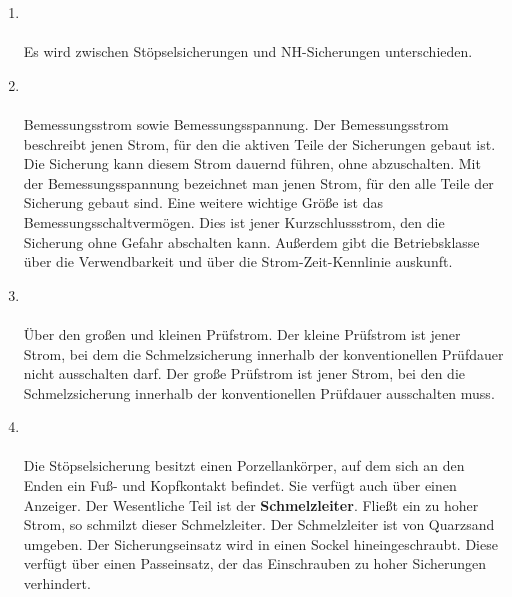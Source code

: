 \begin{enumerate}
    \item   {} \\\\
            Es wird zwischen Stöpselsicherungen und NH-Sicherungen unterschieden.

    \item   {} \\\\
            Bemessungsstrom sowie Bemessungsspannung. Der Bemessungsstrom beschreibt jenen Strom, für den die aktiven Teile der Sicherungen gebaut ist. Die Sicherung 
            kann diesem Strom dauernd führen, ohne abzuschalten. Mit der Bemessungsspannung bezeichnet man jenen Strom, für den alle Teile der Sicherung gebaut sind.
            Eine weitere wichtige Größe ist das Bemessungsschaltvermögen. Dies ist jener Kurzschlussstrom, den die Sicherung ohne Gefahr abschalten kann.
            Außerdem gibt die Betriebsklasse über die Verwendbarkeit und über die Strom-Zeit-Kennlinie auskunft.

    \item   {} \\\\
            Über den großen und kleinen Prüfstrom. Der kleine Prüfstrom ist jener Strom, bei dem die Schmelzsicherung innerhalb der konventionellen Prüfdauer nicht ausschalten darf. Der große Prüfstrom ist jener Strom, 
            bei den die Schmelzsicherung innerhalb der konventionellen Prüfdauer ausschalten muss.

    \item   {} \\\\
            Die Stöpselsicherung besitzt einen Porzellankörper, auf dem sich an den Enden ein Fuß- und Kopfkontakt befindet.
            Sie verfügt auch über einen Anzeiger. Der Wesentliche Teil ist der \textbf{Schmelzleiter}. Fließt ein zu hoher Strom, so schmilzt dieser Schmelzleiter.
            Der Schmelzleiter ist von Quarzsand umgeben. Der Sicherungseinsatz wird in einen Sockel hineingeschraubt. Diese verfügt über einen Passeinsatz, der das Einschrauben 
            zu hoher Sicherungen verhindert.


\end{enumerate}
